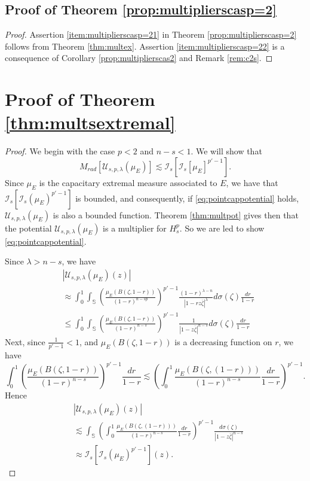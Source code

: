 \documentclass[12pt,twoside,leqno,final]{amsart}
\theoremstyle{plain}
\begin{document}
\subsection{Proof of Theorem \ref{prop:multiplierscasp=2}}
\begin{proof}
Assertion \eqref{item:multiplierscasp=21} in Theorem \ref{prop:multiplierscasp=2} follows from Theorem \ref{thm:multex}. Assertion \eqref{item:multiplierscasp=22} is a consequence of Corollary \ref{prop:multiplierscas2} and Remark \ref{rem:c2s}.
\end{proof}

\section{Proof of Theorem \ref{thm:multsextremal}}\label{sec:examples}
\begin{proof}

We begin with the case $p<2$ and $n-s<1$. We will show that 
\begin{equation}\label{eq:pointcappotential}M_{rad}[{\mathcal U}_{s,p,\lambda}(\mu_E)]\lesssim 
\mathcal{I}_s[\mathcal{I}_s[\mu_E]^{p'-1}].\end{equation}
Since $\mu_E$ is the capacitary extremal measure associated to $E$, we have that $\mathcal{I}_s[\mathcal{I}_s(\mu_E)^{p'-1}]$ is bounded, and consequently, if \eqref{eq:pointcappotential} holds, ${\mathcal U}_{s,p,\lambda}(\mu_E)$ is also a bounded function. Theorem \ref{thm:multpot} gives then that the potential  ${\mathcal U}_{s,p,\lambda}(\mu_E)$ is a multiplier for $H_s^p$.
So we are led to show \eqref{eq:pointcappotential}.

Since $\lambda>n-s$, we have
\begin{equation*}\begin{split}&
|{\mathcal U}_{s,p,\lambda}(\mu_E)(z)| \\&
\approx \int_0^1\int_{{\mathbb S}} \left(\frac{\mu_E(B(\zeta,1-r))}{(1-r)^{n-sp}} \right)^{p'-1}\frac{(1-r)^{\lambda-n}}{|1-rz\overline{\zeta}|^\lambda}d\sigma(\zeta)\frac{dr}{1-r}\\&
\leq \int_0^1\int_{{\mathbb S}} \left(\frac{\mu_E(B(\zeta,1-r))}{(1-r)^{n-s}} \right)^{p'-1}\frac{1}{|1-z\overline{\zeta}|^{n-s}}d\sigma(\zeta)\frac{dr}{1-r}
\end{split}
\end{equation*}
Next,  since $\frac1{p'-1}<1$, and $\mu_E(B(\zeta,1-r))$ is a decreasing function on $r$, we have
$$
\int_0^1 \left(\frac{\mu_E(B(\zeta,1-r))}{(1-r)^{n-s}} \right)^{p'-1}\frac{dr}{1-r}\lesssim \left(\int_0^1\frac{\mu_E(B(\zeta, (1-r)))}{(1-r)^{n-s}}\frac{dr}{1-r}\right)^{p'-1}.$$
Hence 
\begin{equation*}\begin{split}&
|{\mathcal U}_{s,p,\lambda}(\mu_E)(z)| \\&
\lesssim \int_{{\mathbb S}}\left(\int_0^1\frac{\mu_E(B(\zeta, (1-r)))}{(1-r)^{n-s}}\frac{dr}{1-r}\right)^{p'-1}\frac{d\sigma(\zeta)}{|1-z\overline{\zeta}|^{n-s}}\\&\approx \mathcal{I}_s[\mathcal{I}_s(\mu_E)^{p'-1}](z).
\end{split}\end{equation*}


\end{proof}
\end{document}
